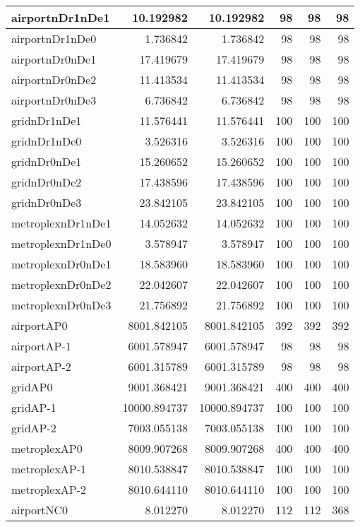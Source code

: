 \begin{longtable}{|l|r|r|r|r|r|}
\endlastfoot
airportnDr1nDe1 & 10.192982 & 10.192982 & 98 & 98 & 98 \\ \hline
airportnDr1nDe0 & 1.736842 & 1.736842 & 98 & 98 & 98 \\ \hline
airportnDr0nDe1 & 17.419679 & 17.419679 & 98 & 98 & 98 \\ \hline
airportnDr0nDe2 & 11.413534 & 11.413534 & 98 & 98 & 98 \\ \hline
airportnDr0nDe3 & 6.736842 & 6.736842 & 98 & 98 & 98 \\ \hline
gridnDr1nDe1 & 11.576441 & 11.576441 & 100 & 100 & 100 \\ \hline
gridnDr1nDe0 & 3.526316 & 3.526316 & 100 & 100 & 100 \\ \hline
gridnDr0nDe1 & 15.260652 & 15.260652 & 100 & 100 & 100 \\ \hline
gridnDr0nDe2 & 17.438596 & 17.438596 & 100 & 100 & 100 \\ \hline
gridnDr0nDe3 & 23.842105 & 23.842105 & 100 & 100 & 100 \\ \hline
metroplexnDr1nDe1 & 14.052632 & 14.052632 & 100 & 100 & 100 \\ \hline
metroplexnDr1nDe0 & 3.578947 & 3.578947 & 100 & 100 & 100 \\ \hline
metroplexnDr0nDe1 & 18.583960 & 18.583960 & 100 & 100 & 100 \\ \hline
metroplexnDr0nDe2 & 22.042607 & 22.042607 & 100 & 100 & 100 \\ \hline
metroplexnDr0nDe3 & 21.756892 & 21.756892 & 100 & 100 & 100 \\ \hline
airportAP0 & 8001.842105 & 8001.842105 & 392 & 392 & 392 \\ \hline
airportAP-1 & 6001.578947 & 6001.578947 & 98 & 98 & 98 \\ \hline
airportAP-2 & 6001.315789 & 6001.315789 & 98 & 98 & 98 \\ \hline
gridAP0 & 9001.368421 & 9001.368421 & 400 & 400 & 400 \\ \hline
gridAP-1 & 10000.894737 & 10000.894737 & 100 & 100 & 100 \\ \hline
gridAP-2 & 7003.055138 & 7003.055138 & 100 & 100 & 100 \\ \hline
metroplexAP0 & 8009.907268 & 8009.907268 & 400 & 400 & 400 \\ \hline
metroplexAP-1 & 8010.538847 & 8010.538847 & 100 & 100 & 100 \\ \hline
metroplexAP-2 & 8010.644110 & 8010.644110 & 100 & 100 & 100 \\ \hline
airportNC0 & 8.012270 & 8.012270 & 112 & 112 & 368 \\ \hline

\end{longtable}
